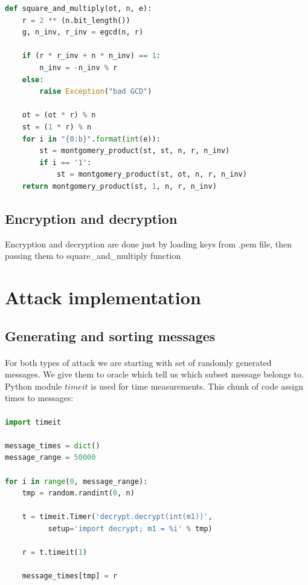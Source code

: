 \documentclass[thesis=B,english]{FITthesis}[2012/10/20]
\begin{document}
\begin{lstlisting}[language=Python]
 def square_and_multiply(ot, n, e):
    r = 2 ** (n.bit_length())
    g, n_inv, r_inv = egcd(n, r)

    if (r * r_inv + n * n_inv) == 1:
        n_inv = -n_inv % r
    else:
        raise Exception("bad GCD")

    ot = (ot * r) % n
    st = (1 * r) % n
    for i in "{0:b}".format(int(e)):
        st = montgomery_product(st, st, n, r, n_inv)
        if i == '1':
            st = montgomery_product(st, ot, n, r, n_inv)
    return montgomery_product(st, 1, n, r, n_inv)
\end{lstlisting}

\subsection{Encryption and decryption}{
Encryption and decryption are done just by loading keys from .pem file, then passing them to square\_and\_multiply function
}
\newpage
\section{Attack implementation}

\subsection{Generating and sorting messages}
\paragraph*{}{ 
For both types of attack we are starting with set of randomly generated messages. We give them to oracle which tell us which subset message belongs to. Python module \(timeit\) is used for time measurements. This chunk of code assign times to messages:
}
\paragraph*{}
\begin{lstlisting}[language=Python]
import timeit

message_times = dict()
message_range = 50000

for i in range(0, message_range):
    tmp = random.randint(0, n)

    t = timeit.Timer('decrypt.decrypt(int(m1))', 
	      setup='import decrypt; m1 = %i' % tmp)

    r = t.timeit(1)

    message_times[tmp] = r
\end{lstlisting}
\end{document}
